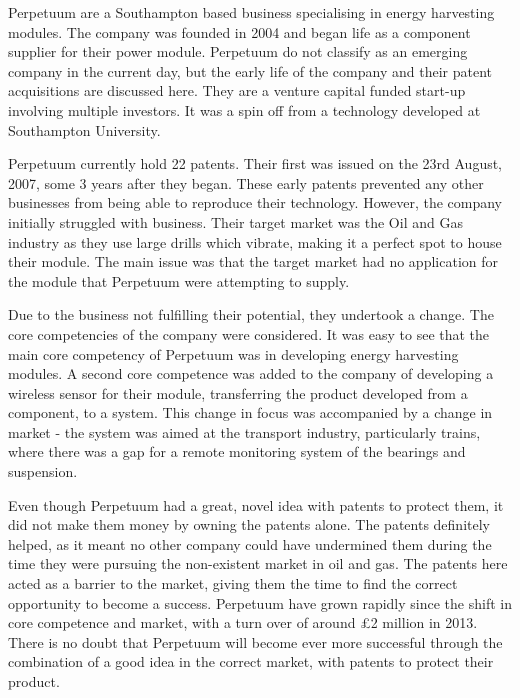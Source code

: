 {}


Perpetuum are a Southampton based business specialising in energy harvesting modules. 
The company was founded in 2004 and began life as a component supplier for their power module.
Perpetuum do not classify as an emerging company in the current day, but the early life of the company and their patent acquisitions are discussed here. 
They are a venture capital funded start-up involving multiple investors.
It was a spin off from a technology developed at Southampton University. 

Perpetuum currently hold 22 patents. 
Their first was issued on the 23rd August, 2007, some 3 years after they began.
These early patents prevented any other businesses from being able to reproduce their technology. 
However, the company initially struggled with business. %
Their target market was the Oil and Gas industry as they use large drills which vibrate, making it a perfect spot to house their module.
The main issue was that the target market had no application for the module that Perpetuum were attempting to supply. %

Due to the business not fulfilling their potential, they undertook a change. 
The core competencies of the company were considered.
It was easy to see that the main core competency of Perpetuum was in developing energy harvesting modules. 
A second core competence was added to the company of developing a wireless sensor for their module, transferring the product developed from a component, to a system.
This change in focus was accompanied by a change in market - the system was aimed at the transport industry, particularly trains, where there was a gap for a remote monitoring system of the bearings and suspension. 

Even though Perpetuum had a great, novel idea with patents to protect them, it did not make them money by owning the patents alone.
The patents definitely helped, as it meant no other company could have undermined them during the time they were pursuing the non-existent market in oil and gas.
The patents here acted as a barrier to the market, giving them the time to find the correct opportunity to become a success.
Perpetuum have grown rapidly since the shift in core competence and market, with a turn over of around \pounds 2 million in 2013.
There is no doubt that Perpetuum will become ever more successful through the combination of a good idea in the correct market, with patents to protect their product. 

